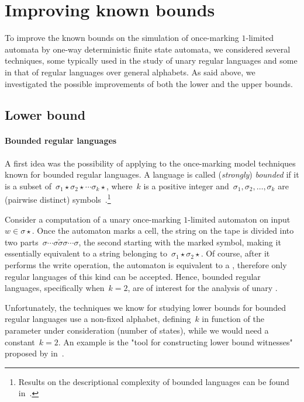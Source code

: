 \section{Improving known bounds}\label{sec:oncemarking-ideas}
To improve the known bounds on the simulation of once-marking $1$-limited automata by one-way deterministic finite state automata, we considered several techniques, some typically used in the study of unary regular languages and some in that of regular languages over general alphabets.
As said above, we investigated the possible improvements of both the lower and the upper bounds.


\subsection{Lower bound}

\paragraph{Bounded regular languages} A first idea was the possibility of applying to the once-marking model techniques known for bounded regular languages.
A language is called (\emph{strongly}) \emph{bounded} if it is a subset of~$\sigma_1\star\sigma_2\star\cdots\sigma_k\star$, where~$k$ is a positive integer and~$\sigma_1,\sigma_2,\dots,\sigma_k$ are (pairwise distinct) symbols~\cite{GinSpa66}.\footnote{%
	Results on the descriptional complexity of bounded languages can be found in~\cite{Gin66,MalPig13,IbaRav16,HerKut+17}.}

Consider a computation of a unary once-marking $1$-limited automaton on input~$w\in\sigma\star$.
Once the automaton marks a cell, the string on the tape is divided into two parts~$\sigma\cdots\sigma \tilde\sigma \sigma\cdots\sigma$, the second starting with the marked symbol, making it essentially equivalent to a string belonging to~$\sigma_1\star\sigma_2\star$.
Of course, after it performs the write operation, the automaton is equivalent to a \TNFA, therefore only regular languages of this kind can be accepted.
Hence, bounded regular languages, specifically when~$k=2$, are of interest for the analysis of unary \OMOLAs.

Unfortunately, the techniques we know for studying lower bounds for bounded regular languages use a non-fixed alphabet, defining~$k$ in function of the parameter under consideration (number of states), while we would need a constant~$k=2$.
An example is the "tool for constructing lower bound witnesses" proposed by \citeauthor{HerKut+17} in~\cite{HerKut+17}.

